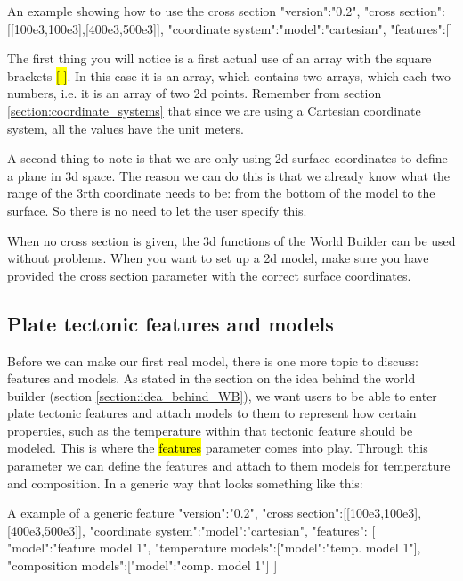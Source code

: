 \documentclass{book}
\newcommand{\WB}{{World Builder}}
\begin{document}
\begin{javascriptcode}{An example showing how to use the cross section}{}
{
  "version":"0.2",
  "cross section":[[100e3,100e3],[400e3,500e3]],
  "coordinate system":{"model":"cartesian"},
  "features":[]
}
\end{javascriptcode}

The first thing you will notice is a first actual use of an array with the square brackets \hl{[ ]}. In this case it is an array, which contains two arrays, which each two numbers, i.e. it is an array of two 2d points. Remember from section \ref{section:coordinate_systems} that since we are using a Cartesian coordinate system, all the values have the unit meters. 

A second thing to note is that we are only using 2d surface coordinates to define a plane in 3d space. The reason we can do this is that we already know what the range of the 3rth coordinate needs to be: from the bottom of the model to the surface. So there is no need to let the user specify this.

When no cross section is given, the 3d functions of the \WB{} can be used without problems. When you want to set up a 2d model, make sure you have provided the cross section parameter with the correct surface coordinates.

\subsection{Plate tectonic features and models}
Before we can make our first real model, there is one more topic to discuss: features and models. As stated in the section on the idea behind the world builder (section \ref{section:idea_behind_WB}), we want users to be able to enter plate tectonic features and attach models to them to represent how certain properties, such as the temperature within that tectonic feature should be modeled. This is where the \hl{features} parameter comes into play. Through this parameter we can define the features and attach to them models for temperature and composition. In a generic way that looks something like this:

\begin{javascriptcode}{A example of a generic feature}{}
{
  "version":"0.2",
  "cross section":[[100e3,100e3],[400e3,500e3]],
  "coordinate system":{"model":"cartesian"},
  "features":
  [
    {
      "model":"feature model 1",
      "temperature models":[{"model":"temp. model 1"}],
      "composition models":[{"model":"comp. model 1"}]
    }
  ]
}
\end{javascriptcode}
\end{document}
